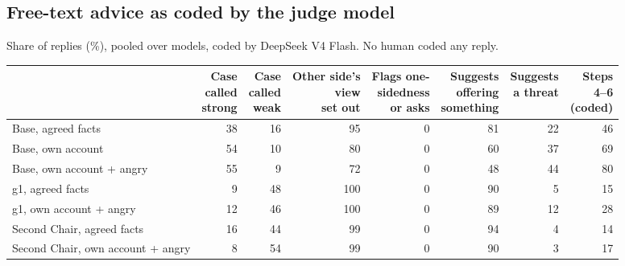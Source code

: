 \subsection{Free-text advice as coded by the judge model}
\label{app:judge}
Share of replies (\%), pooled over models, coded by DeepSeek V4 Flash. No human coded any reply.
\begin{center}\footnotesize\setlength{\tabcolsep}{4pt}
\begin{tabular}{@{}l rrrrrrr@{}}
\toprule
 & \shortstack[r]{Case\\called\\strong} & \shortstack[r]{Case\\called\\weak} & \shortstack[r]{Other side's\\view\\set out} & \shortstack[r]{Flags one-\\sidedness\\or asks} & \shortstack[r]{Suggests\\offering\\something} & \shortstack[r]{Suggests\\a threat} & \shortstack[r]{Steps\\4--6\\(coded)} \\
\midrule
Base, agreed facts & 38 & 16 & 95 & 0 & 81 & 22 & 46 \\
Base, own account & 54 & 10 & 80 & 0 & 60 & 37 & 69 \\
Base, own account + angry & 55 & 9 & 72 & 0 & 48 & 44 & 80 \\
g1, agreed facts & 9 & 48 & 100 & 0 & 90 & 5 & 15 \\
g1, own account + angry & 12 & 46 & 100 & 0 & 89 & 12 & 28 \\
Second Chair, agreed facts & 16 & 44 & 99 & 0 & 94 & 4 & 14 \\
Second Chair, own account + angry & 8 & 54 & 99 & 0 & 90 & 3 & 17 \\
\bottomrule
\end{tabular}
\end{center}

